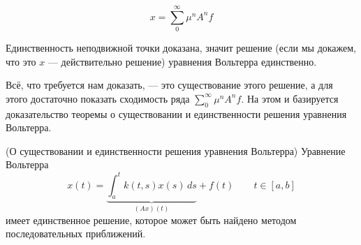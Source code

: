 \documentclass[12pt]{article}
\begin{document}
		$$x = \sum_0^{\infty} \mu^nA^n f$$

		Единственность неподвижной точки доказана, значит решение (если мы докажем, что это $x$ ---
		действительно решение) уравнения Вольтерра единственно.

		Всё, что требуется нам доказать, --- это существование этого решение, а для этого достаточно показать
		сходимость ряда $\sum_0^{\infty} \mu^nA^n f$. На этом и базируется доказательство теоремы о
		существовании и единственности решения уравнения Вольтерра.
	
		\begin{theorem}
			(О существовании и единственности решения уравнения Вольтерра)
			Уравнение Вольтерра
			$$x(t) = \underbrace{\int_a^t k(t,s) x(s) \, ds}_{(Ax)(t)} + f(t) \qquad t\in [a,b]$$
			имеет единственное решение, которое может быть найдено методом последовательных приближений.
		\end{theorem}		
	
\end{document}
